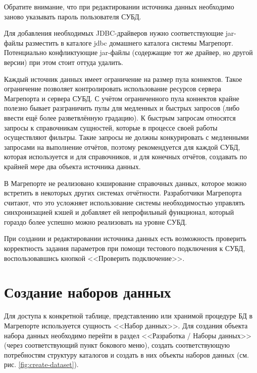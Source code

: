 \documentclass[../user-manual.tex]{subfiles}
\begin{document}
	\begin{NB}
		Обратите внимание, что при редактировании источника данных необходимо заново указывать пароль пользователя СУБД.
	\end{NB}

	\begin{adminnote}
		Для добавления необходимых JDBC-драйверов нужно соответствующие jar-файлы разместить в каталоге jdbc домашнего каталога системы Магрепорт. Потенциально конфликтующие jar-файлы (содержащие тот же драйвер, но другой версии) при этом стоит оттуда удалить.
	\end{adminnote}

	\begin{concept}
		Каждый источник данных имеет ограничение на размер пула коннектов. Такое ограничение позволяет контролировать использование ресурсов сервера Магрепорта и сервера СУБД. С учётом ограниченного пула коннектов крайне полезно бывает разграничить пулы для медленных и быстрых запросов (либо ввести ещё более разветвлённую градацию). К быстрым запросам относятся запросы к справочникам сущностей, которые в процессе своей работы осуществляют фильтры. Такие запросы не должны конкурировать с медленными запросами на выполнение отчётов, поэтому рекомендуется для каждой СУБД, которая используется и для справочников, и для конечных отчётов, создавать по крайней мере два объекта источника данных.
	\end{concept}

	\begin{concept}
		В Магрепорте не реализовано кэширование справочных данных, которое можно встретить в некоторых других системах отчётности. Разработчики Магрепорта считают, что это усложняет использование системы необходимостью управлять синхронизацией кэшей и добавляет ей непрофильный функционал, который гораздо более успешно можно реализовать на уровне СУБД.
	\end{concept}
		

	При создании и редактировании источника данных есть возможность проверить корректность задания параметров при помощи тестового подключения к СУБД, воспользовавшись кнопкой <<Проверить подключение>>.
		
	\section{Создание наборов данных}
	
	Для доступа к конкретной таблице, представлению или хранимой процедуре БД в Магрепорте используется сущность <<Набор данных>>. Для создания объекта набора данных необходимо перейти в раздел <<Разработка / Наборы данных>> (через соответствующий пункт бокового меню), создать соответствующую потребностям структуру каталогов и создать в них объекты наборов данных (см. рис. \ref{fig:create-dataset}).
	
\end{document}
